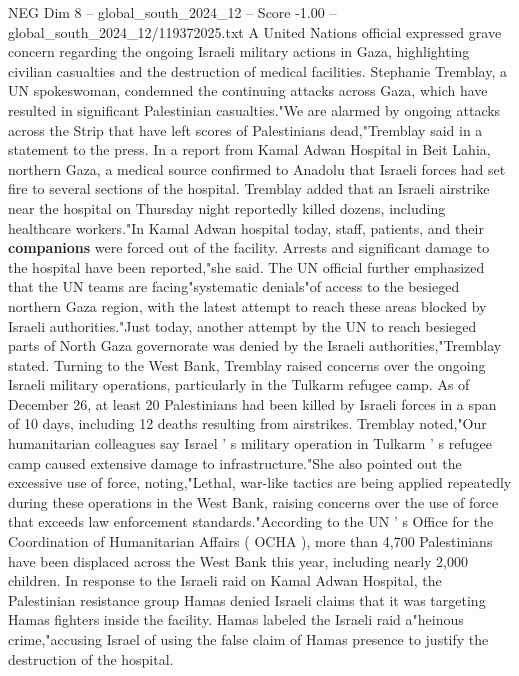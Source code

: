 \begin{textsample}{NEG Dim 8 – global\_south\_2024\_12 – Score -1.00 – global\_south\_2024\_12/119372025.txt}  \label{ex:f8_neg_105}
A United Nations official expressed grave concern regarding the ongoing Israeli military actions in Gaza, highlighting civilian casualties and the destruction of medical facilities.
Stephanie Tremblay, a UN spokeswoman, condemned the continuing attacks across Gaza, which have resulted in significant Palestinian casualties."We are alarmed by ongoing attacks across the Strip that have left scores of Palestinians dead,"Tremblay said in a statement to the press.
In a report from Kamal Adwan Hospital in Beit Lahia, northern Gaza, a medical source confirmed to Anadolu that Israeli forces had set fire to several sections of the hospital.
Tremblay added that an Israeli airstrike near the hospital on Thursday night reportedly killed dozens, including healthcare workers."In Kamal Adwan hospital today, staff, patients, and their \textbf{companions} were forced out of the facility.
Arrests and significant damage to the hospital have been reported,"she said.
The UN official further emphasized that the UN teams are facing"systematic denials"of access to the besieged northern Gaza region, with the latest attempt to reach these areas blocked by Israeli authorities."Just today, another attempt by the UN to reach besieged parts of North Gaza governorate was denied by the Israeli authorities,"Tremblay stated.
Turning to the West Bank, Tremblay raised concerns over the ongoing Israeli military operations, particularly in the Tulkarm refugee camp.
As of December 26, at least 20 Palestinians had been killed by Israeli forces in a span of 10 days, including 12 deaths resulting from airstrikes.
Tremblay noted,"Our humanitarian colleagues say Israel ' s military operation in Tulkarm ' s refugee camp caused extensive damage to infrastructure."She also pointed out the excessive use of force, noting,"Lethal, war-like tactics are being applied repeatedly during these operations in the West Bank, raising concerns over the use of force that exceeds law enforcement standards."According to the UN ' s Office for the Coordination of Humanitarian Affairs ( OCHA ), more than 4,700 Palestinians have been displaced across the West Bank this year, including nearly 2,000 children.
In response to the Israeli raid on Kamal Adwan Hospital, the Palestinian resistance group Hamas denied Israeli claims that it was targeting Hamas fighters inside the facility.
Hamas labeled the Israeli raid a"heinous crime,"accusing Israel of using the false claim of Hamas presence to justify the destruction of the hospital.

\end{textsample}
